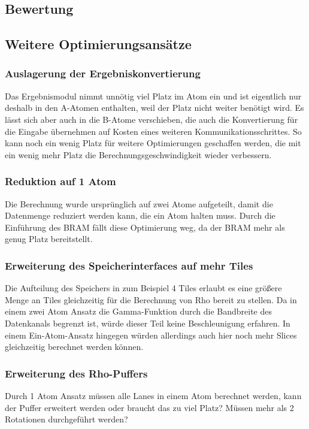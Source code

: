 \subsection{Bewertung}

\subsection{Weitere Optimierungsansätze}

\subsubsection{Auslagerung der Ergebniskonvertierung}
Das Ergebnismodul nimmt unnötig viel Platz im Atom ein und ist eigentlich nur deshalb in den A-Atomen enthalten, weil der Platz nicht weiter benötigt wird.
Es lässt sich aber auch in die B-Atome verschieben, die auch die Konvertierung für die Eingabe übernehmen auf Kosten eines weiteren Kommunikationsschrittes.
So kann noch ein wenig Platz für weitere Optimierungen geschaffen werden, die mit ein wenig mehr Platz die Berechnungsgeschwindigkeit wieder verbessern.

\subsubsection{Reduktion auf 1 Atom}
Die Berechnung wurde ursprünglich auf zwei Atome aufgeteilt, damit die Datenmenge reduziert werden kann, die ein Atom halten muss.
Durch die Einführung des BRAM fällt diese Optimierung weg, da der BRAM mehr als genug Platz bereitstellt.

\subsubsection{Erweiterung des Speicherinterfaces auf mehr Tiles}
Die Aufteilung des Speichers in zum Beispiel 4 Tiles erlaubt es eine größere Menge an Tiles gleichzeitig für die Berechnung von Rho bereit zu stellen.
Da in einem zwei Atom Ansatz die Gamma-Funktion durch die Bandbreite des Datenkanals begrenzt ist, würde dieser Teil keine Beschleunigung erfahren.
In einem Ein-Atom-Ansatz hingegen würden allerdings auch hier noch mehr Slices gleichzeitig berechnet werden können.

\subsubsection{Erweiterung des Rho-Puffers}
Durch 1 Atom Ansatz müssen alle Lanes in einem Atom berechnet werden, kann der Puffer erweitert werden oder braucht das zu viel Platz?
Müssen mehr als 2 Rotationen durchgeführt werden?

